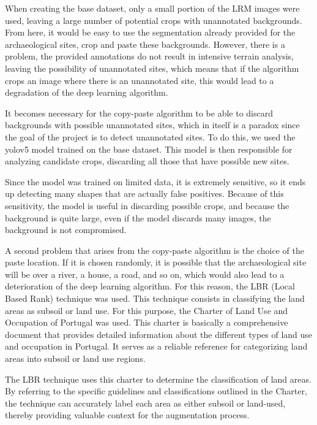 When creating the base dataset, only a small portion of the LRM images were used, leaving a large number of potential crops with unannotated backgrounds. From here, it would be easy to use the segmentation already provided for the archaeological sites, crop and paste these backgrounds. However, there is a problem, the provided annotations do not result in intensive terrain analysis, leaving the possibility of unannotated sites, which means that if the algorithm crops an image where there is an unannotated site, this would lead to a degradation of the deep learning algorithm.

It becomes necessary for the copy-paste algorithm to be able to discard backgrounds with possible unannotated sites, which in itself is a paradox since the goal of the project is to detect unannotated sites. To do this, we used the yolov5 model trained on the base dataset. This model is then responsible for analyzing candidate crops, discarding all those that have possible new sites. 

Since the model was trained on limited data, it is extremely sensitive, so it ends up detecting many shapes that are actually false positives. Because of this sensitivity, the model is useful in discarding possible crops, and because the background is quite large, even if the model discards many images, the background is not compromised.

A second problem that arises from the copy-paste algorithm is the choice of the paste location. If it is chosen randomly, it is possible that the archaeological site will be over a river, a house, a road, and so on, which would also lead to a deterioration of the deep learning algorithm. For this reason, the LBR (Local Based Rank) technique was used. This technique consists in classifying the land areas as subsoil or land use. For this purpose, the Charter of Land Use and Occupation of Portugal\cite{charterPortugal} was used. This charter is basically a comprehensive document that provides detailed information about the different types of land use and occupation in Portugal. It serves as a reliable reference for categorizing land areas into subsoil or land use regions.

The LBR technique uses this charter to determine the classification of land areas. By referring to the specific guidelines and classifications outlined in the Charter, the technique can accurately label each area as either subsoil or land-used, thereby providing valuable context for the augmentation process.


